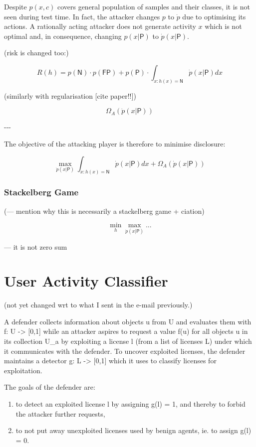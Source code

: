 \documentclass[10pt]{article}
\begin{document}
Despite \(p(x, c)\) covers general population of samples and their
classes, it is not seen during test time. In fact, the attacker changes
\(p\) to \(\dot{p}\) due to optimising its actions. A rationally acting
attacker does not generate activity \(x\) which is not optimal and, in
consequence, changing \(p(x|\mathsf{P})\) to \(\dot{p}(x|\mathsf{P})\).

(risk is changed too:)

\[
R(h) = p(\mathsf{N}) \cdot p(\mathsf{FP}) + p(\mathsf{P}) \cdot \int_{x: h(x)=\mathsf{N}} \dot{p}(x|\mathsf{P}) dx
\]

(similarly with regularisation {[}cite paper!!{]})

\[
\Omega_A(\dot{p}(x|\mathsf{P}))
\]

-\/-\/-

The objective of the attacking player is therefore to minimise
disclosure:

\[
\max_{\dot{p}(x|\mathsf{P})} \int_{x: h(x)=\mathsf{N}} \dot{p}(x|\mathsf{P}) dx + \Omega_A(\dot{p}(x|\mathsf{P}))
\]

\subsubsection{Stackelberg Game}

(— mention why this is necessarily a stackelberg game + ciation)

\[
\min_{h} \max_{\dot{p}(x|\mathsf{P})} ...
\]

— it is not zero sum

\section{User Activity Classifier}

(not yet changed wrt to what I sent in the e-mail previously.)

A defender collects information about objects u from U and evaluates
them with f: U -\textgreater{} {[}0,1{]} while an attacker aspires to
request a value f(u) for all objects u in its collection U\_a by
exploiting a license l (from a list of licenses L) under which it
communicates with the defender. To uncover exploited licenses, the
defender maintains a detector g: L -\textgreater{} {[}0,1{]} which it
uses to classify licenses for exploitation.~

The goals of the defender are:

\begin{enumerate}
\def\labelenumi{\arabic{enumi}.}
\item
  to detect an exploited license l by assigning g(l) = 1, and thereby to
  forbid the attacker further requests,
\item
  to not put away unexploited licenses used by benign agents, ie. to
  assign g(l) = 0.~
\end{enumerate}
\end{document}

